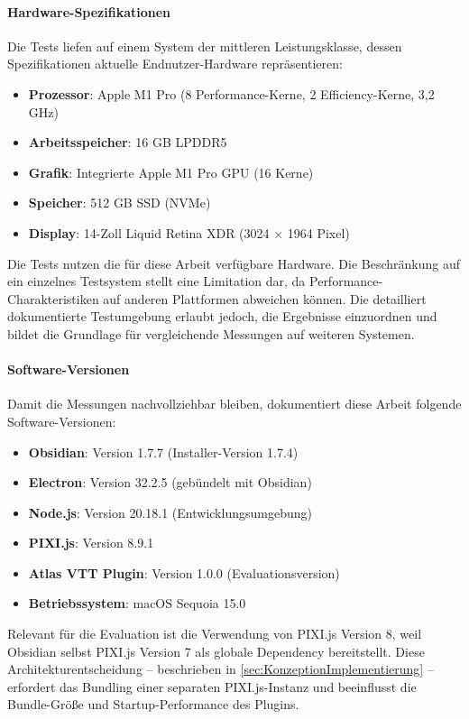 \paragraph{Hardware-Spezifikationen}
Die Tests liefen auf einem System der mittleren Leistungsklasse, dessen Spezifikationen aktuelle Endnutzer-Hardware repräsentieren:
\begin{itemize}
	\item \textbf{Prozessor}: Apple M1 Pro (8 Performance-Kerne, 2 Efficiency-Kerne, 3,2 GHz)
	\item \textbf{Arbeitsspeicher}: 16 \ac{GB} LPDDR5
	\item \textbf{Grafik}: Integrierte Apple M1 Pro \ac{GPU} (16 Kerne)
	\item \textbf{Speicher}: 512 \ac{GB} \ac{SSD} (\ac{NVMe})
	\item \textbf{Display}: 14-Zoll Liquid Retina \ac{XDR} (3024 × 1964 Pixel)
\end{itemize}

Die Tests nutzen die für diese Arbeit verfügbare Hardware. Die Beschränkung auf ein einzelnes Testsystem stellt eine Limitation dar, da Performance-Charakteristiken auf anderen Plattformen abweichen können. Die detailliert dokumentierte Testumgebung erlaubt jedoch, die Ergebnisse einzuordnen und bildet die Grundlage für vergleichende Messungen auf weiteren Systemen.

\paragraph{Software-Versionen}
Damit die Messungen nachvollziehbar bleiben, dokumentiert diese Arbeit folgende Software-Versionen:
\begin{itemize}
	\item \textbf{Obsidian}: Version 1.7.7 (Installer-Version 1.7.4)
	\item \textbf{Electron}: Version 32.2.5 (gebündelt mit Obsidian)
	\item \textbf{Node.js}: Version 20.18.1 (Entwicklungsumgebung)
	\item \textbf{PIXI.js}: Version 8.9.1
	\item \textbf{Atlas \ac{VTT} Plugin}: Version 1.0.0 (Evaluationsversion)
	\item \textbf{Betriebssystem}: macOS Sequoia 15.0
\end{itemize}

Relevant für die Evaluation ist die Verwendung von PIXI.js Version 8, weil Obsidian selbst PIXI.js Version 7 als globale Dependency bereitstellt. Diese Architekturentscheidung -- beschrieben in \autoref{sec:KonzeptionImplementierung} -- erfordert das Bundling einer separaten PIXI.js-Instanz und beeinflusst die Bundle-Größe und Startup-Performance des Plugins.


